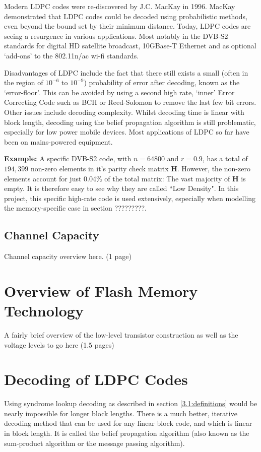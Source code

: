 \documentclass[11pt]{article}
\numberwithin{equation}{subsection}
\begin{document}
Modern LDPC codes were re-discovered by J.C. MacKay in 1996. MacKay demonstrated that LDPC codes could be decoded using probabilistic methods, even beyond the bound set by their minimum distance. Today, LDPC codes are seeing a resurgence in various applications. Most notably in the DVB-S2 standards for digital HD satellite broadcast, 10GBase-T Ethernet and as optional `add-ons' to the 802.11n/ac wi-fi standards.

Disadvantages of LDPC include the fact that there still exists a small (often in the region of $10^{-6}$ to $10^{-9}$) probability of error after decoding, known as the `error-floor'. This can be avoided by using a second high rate, `inner' Error Correcting Code such as BCH or Reed-Solomon to remove the last few bit errors. Other issues include decoding complexity. Whilst decoding time is linear with block length, decoding using the belief propagation algorithm is still problematic, especially for low power mobile devices. Most applications of LDPC so far have been on mains-powered equipment.


\textbf{Example:}
A specific DVB-S2 code, with $n = 64800$ and $r = 0.9$, has a total of $194,399$ non-zero elements in it's parity check matrix $\mathbf{H}$. However, the non-zero elements account for just 0.04\% of the total matrix: The vast majority of $\mathbf{H}$ is empty. It is therefore easy to see why they are called ``Low Density". In this project, this specific high-rate code is used extensively, especially when modelling the memory-specific case in section ?????????.

\subsection{Channel Capacity}

Channel capacity overview here. (1 page)

\section{Overview of Flash Memory Technology} 
A fairly brief overview of the low-level transistor construction as well as the voltage levels to go here (1.5 pages)

\section{Decoding of LDPC Codes} \label{decoding}
Using syndrome lookup decoding as described in section \ref{3.1:definitions} would be nearly impossible for longer block lengths. There is a much better, iterative decoding method that can be used for any linear block code, and which is linear in block length. It is called the belief propagation algorithm (also known as the sum-product algorithm or the message passing algorithm). 
\end{document}
